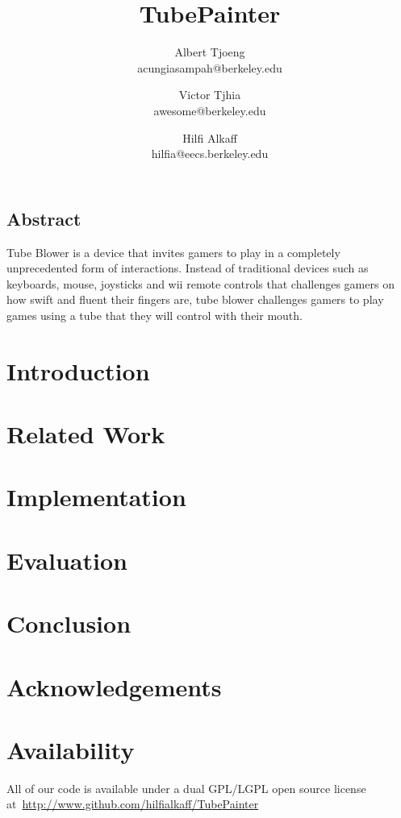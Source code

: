 \documentclass[letterpaper,twocolumn,11pt]{article}
\begin{document}
\date{}

\title{\Large \bf TubePainter}

\author{
{\rm Albert Tjoeng}\\
acungiasampah@berkeley.edu
\and
{\rm Victor Tjhia}\\
awesome@berkeley.edu
\and
{\rm Hilfi Alkaff}\\
hilfia@eecs.berkeley.edu
} %

\maketitle


\subsection*{Abstract}
Tube Blower is a device that invites gamers to play in a completely unprecedented form of interactions. Instead of traditional devices such as keyboards, mouse, joysticks and wii remote controls that challenges gamers on how swift and fluent their fingers are, tube blower challenges gamers to play games using a tube that they will control with their mouth.

\section{Introduction}

\section{Related Work}

\section{Implementation}

\section{Evaluation}

\section{Conclusion}

\section{Acknowledgements}

\section{Availability}

All of our code is available under a dual GPL/LGPL open source license at~\url{http://www.github.com/hilfialkaff/TubePainter}

\footnotesize{
}

\end{document}
